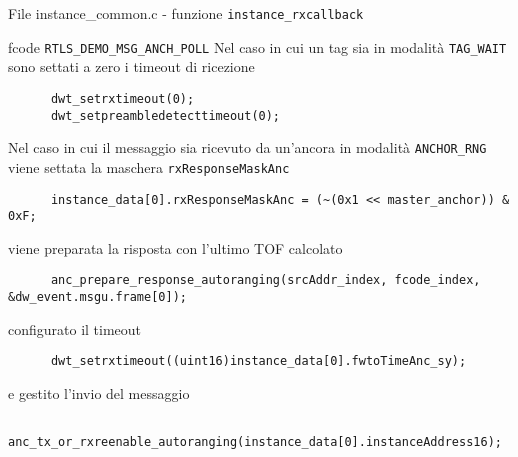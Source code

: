 \begin{frame}[fragile, shrink=30]{File instance\_common.c - funzione \lstinline!instance_rxcallback!}
  \begin{block}{fcode \lstinline!RTLS_DEMO_MSG_ANCH_POLL!}
    Nel caso in cui un tag sia in modalità \lstinline!TAG_WAIT! sono settati a zero i timeout di ricezione
    \begin{lstlisting}
      dwt_setrxtimeout(0);
      dwt_setpreambledetecttimeout(0);
    \end{lstlisting}
    Nel caso in cui il messaggio sia ricevuto da un'ancora in modalità \lstinline!ANCHOR_RNG! viene settata la maschera
    \lstinline!rxResponseMaskAnc!
    \begin{lstlisting}
      instance_data[0].rxResponseMaskAnc = (~(0x1 << master_anchor)) & 0xF;    
    \end{lstlisting}
    viene preparata la risposta con l'ultimo TOF calcolato
    \begin{lstlisting}
      anc_prepare_response_autoranging(srcAddr_index, fcode_index, &dw_event.msgu.frame[0]);
    \end{lstlisting}
    configurato il timeout 
    \begin{lstlisting}
      dwt_setrxtimeout((uint16)instance_data[0].fwtoTimeAnc_sy);
    \end{lstlisting}
    e gestito l'invio del messaggio
    \begin{lstlisting}
      anc_tx_or_rxreenable_autoranging(instance_data[0].instanceAddress16);
    \end{lstlisting}
  \end{block}
\end{frame}

